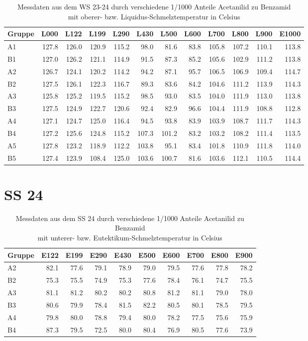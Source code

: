 \begin{table}[h]
\centering \begin{tabular}{lrrrrrrrrrrr}
\toprule
Gruppe & L000 & L122 & L199 & L290 & L430 & L500 & L600 & L700 & L800 & L900 & E1000 \\
\midrule
A1 & 127.8 & 126.0 & 120.9 & 115.2 & 98.0 & 81.6 & 83.8 & 105.8 & 107.2 & 110.1 & 113.8 \\
B1 & 127.0 & 126.2 & 121.1 & 114.9 & 91.5 & 87.3 & 85.2 & 105.6 & 102.9 & 111.2 & 113.8 \\
A2 & 126.7 & 124.1 & 120.2 & 114.2 & 94.2 & 87.1 & 95.7 & 106.5 & 106.9 & 109.4 & 114.7 \\
B2 & 127.5 & 126.1 & 122.3 & 116.7 & 89.3 & 83.6 & 84.2 & 104.6 & 111.2 & 113.9 & 114.3 \\
A3 & 125.8 & 125.2 & 119.5 & 115.2 & 98.5 & 93.0 & 83.5 & 104.0 & 111.9 & 113.0 & 113.8 \\
B3 & 127.5 & 124.9 & 122.7 & 120.6 & 92.4 & 82.9 & 96.6 & 104.4 & 111.9 & 108.8 & 112.8 \\
A4 & 127.1 & 124.7 & 125.0 & 116.4 & 94.5 & 93.8 & 83.9 & 103.9 & 108.7 & 111.7 & 114.3 \\
B4 & 127.2 & 125.6 & 124.8 & 115.2 & 107.3 & 101.2 & 83.2 & 103.2 & 108.2 & 111.4 & 113.5 \\
A5 & 127.8 & 123.2 & 118.9 & 112.2 & 103.8 & 95.1 & 83.4 & 101.8 & 110.9 & 111.8 & 114.0 \\
B5 & 127.4 & 123.9 & 108.4 & 125.0 & 103.6 & 100.7 & 81.6 & 103.6 & 112.1 & 110.5 & 114.4 \\
\bottomrule
\end{tabular}
\caption{Messdaten aus dem WS 23-24 durch verschiedene 1/1000 Anteile Acetanilid zu Benzamid\\mit oberer- bzw. Liquidus-Schmelztemperatur in Celsius}
\end{table}
\newpage\section*{SS 24}
\begin{table}[h]
\centering \begin{tabular}{lrrrrrrrrr}
\toprule
Gruppe & E122 & E199 & E290 & E430 & E500 & E600 & E700 & E800 & E900 \\
\midrule
A2 & 82.1 & 77.6 & 79.1 & 78.9 & 79.0 & 79.5 & 77.6 & 77.8 & 78.2 \\
B2 & 75.3 & 75.5 & 74.9 & 75.3 & 77.6 & 78.4 & 76.1 & 74.7 & 75.5 \\
A3 & 81.1 & 81.2 & 80.2 & 80.2 & 80.8 & 81.2 & 81.1 & 79.0 & 78.0 \\
B3 & 80.6 & 79.9 & 78.4 & 81.5 & 82.2 & 80.5 & 80.1 & 78.5 & 79.5 \\
A4 & 79.8 & 80.0 & 78.8 & 79.4 & 80.0 & 78.2 & 77.5 & 75.6 & 75.9 \\
B4 & 87.3 & 79.5 & 72.5 & 80.0 & 80.4 & 76.9 & 80.5 & 77.6 & 73.9 \\
\bottomrule
\end{tabular}
\caption{Messdaten aus dem SS 24 durch verschiedene 1/1000 Anteile Acetanilid zu Benzamid\\mit unterer- bzw. Eutektikum-Schmelztemperatur in Celsius}
\end{table}
